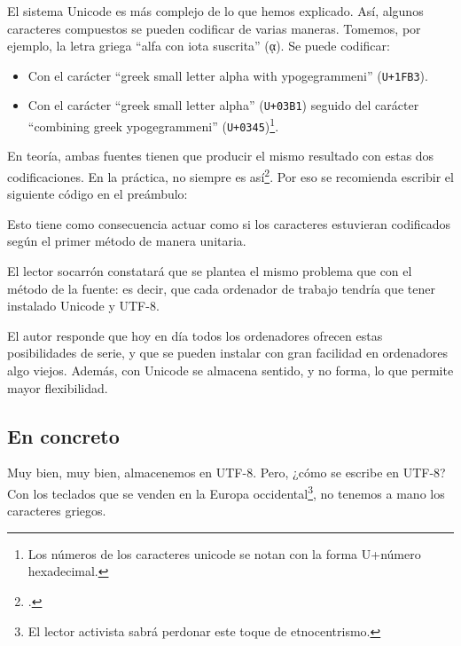 \begin{attention}
El sistema Unicode es más complejo de lo que hemos explicado. Así, algunos caracteres compuestos se pueden codificar de varias maneras. Tomemos, por ejemplo, la letra griega \enquote{alfa con iota suscrita} (ᾳ). Se puede codificar:
\begin{itemize}
	\item Con el carácter \enquote{\textenglish{greek small letter alpha with ypogegrammeni}} (\verb|U+1FB3|).
	\item Con el carácter \enquote{\textenglish{greek small letter alpha}} (\verb|U+03B1|) seguido del carácter \enquote{\textenglish{combining greek ypogegrammeni}} (\verb|U+0345|)\footnote{Los números de los caracteres unicode se notan con la forma U+número hexadecimal.}. 
\end{itemize}

En teoría, ambas fuentes tienen que producir el mismo resultado con estas dos codificaciones. En la práctica, no siempre es así\footcite[Para los ejemplos y más explicaciónes, véase:][]{normalisation_unicode}. Por eso se recomienda escribir el siguiente código en el preámbulo:
\begin{latexcode}
\end{latexcode}

Esto tiene como consecuencia actuar como si los caracteres estuvieran codificados según el primer método de manera unitaria.
\end{attention}

\begin{plusloins}
El lector socarrón constatará que se plantea el mismo problema que con el método de la fuente: es decir, que cada ordenador de trabajo tendría que tener instalado Unicode y UTF-8. 

El autor responde que hoy en día todos los ordenadores ofrecen estas posibilidades de serie, y que se pueden instalar con gran facilidad en ordenadores algo viejos. Además, con Unicode se almacena sentido, y no forma, lo que permite mayor flexibilidad. 
\end{plusloins}


\subsection{En concreto}

Muy bien, muy bien, almacenemos en UTF-8. Pero, ¿cómo se escribe en UTF-8? Con los teclados que se venden en la Europa occidental\footnote{El lector activista sabrá perdonar este toque de etnocentrismo.}, no tenemos a mano los caracteres griegos.

